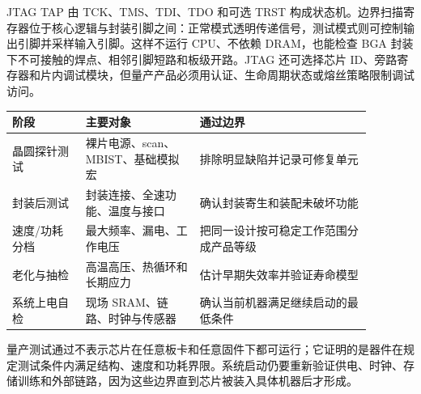
JTAG TAP 由 TCK、TMS、TDI、TDO 和可选 TRST 构成状态机。边界扫描寄存器位于核心逻辑与封装引脚之间：正常模式透明传递信号，测试模式则可控制输出引脚并采样输入引脚。这样不运行 CPU、不依赖 DRAM，也能检查 BGA 封装下不可接触的焊点、相邻引脚短路和板级开路。JTAG 还可选择芯片 ID、旁路寄存器和片内调试模块，但量产产品必须用认证、生命周期状态或熔丝策略限制调试访问。


\begin{longtable}{L{0.18\linewidth}L{0.28\linewidth}L{0.42\linewidth}}
\toprule
阶段 & 主要对象 & 通过边界 \\
\midrule
晶圆探针测试 & 裸片电源、scan、MBIST、基础模拟宏 & 排除明显缺陷并记录可修复单元 \\\tablerowrule
封装后测试 & 封装连接、全速功能、温度与接口 & 确认封装寄生和装配未破坏功能 \\\tablerowrule
速度/功耗分档 & 最大频率、漏电、工作电压 & 把同一设计按可稳定工作范围分成产品等级 \\\tablerowrule
老化与抽检 & 高温高压、热循环和长期应力 & 估计早期失效率并验证寿命模型 \\\tablerowrule
系统上电自检 & 现场 SRAM、链路、时钟与传感器 & 确认当前机器满足继续启动的最低条件 \\
\bottomrule
\end{longtable}

量产测试通过不表示芯片在任意板卡和任意固件下都可运行；它证明的是器件在规定测试条件内满足结构、速度和功耗界限。系统启动仍要重新验证供电、时钟、存储训练和外部链路，因为这些边界直到芯片被装入具体机器后才形成。
